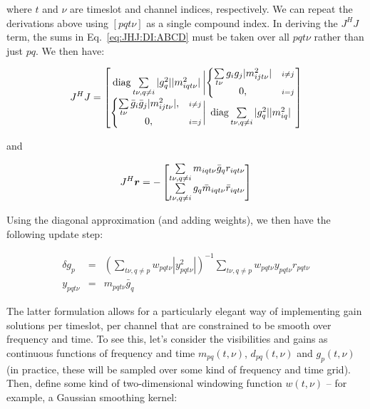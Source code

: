 \documentclass[useAMS,usenatbib]{mn2e}
\newcommand{\JJ}{J} %
\newcommand{\JHJ}{J^H J} %
\begin{document}
where $t$ and $\nu$ are timeslot and channel indices, respectively. We can repeat the derivations above using 
$[pqt\nu]$ as a single compound index. In deriving the $\JHJ$ term, the sums in Eq.~\ref{eq:JHJ:DI:ABCD}
must be taken over all $pqt\nu$ rather than just $pq$. We then have:

\begin{equation}
\label{eq:JHJ:DI:tf}
\JJ^H \JJ = \Matrix{c@{\bigg |}c}{
\mathrm{diag} \sum\limits_{t\nu,q\ne i} |g^2_{q}| |m^2_{iqt\nu}| & 
  \left \{ 
  \begin{array}{@{}cc@{}}
   \sum\limits_{t\nu} g_{i} g_{j} |m^2_{ijt\nu}|&{\scriptstyle i\ne j} \\
   0, &{\scriptstyle i=j}
  \end{array} \right .\\
  \left \{ 
  \begin{array}{@{}cc@{}}
   \sum\limits_{t\nu} \bar{g}_{i} \bar{g}_{j} |m^2_{ijt\nu}|,&{\scriptstyle i\ne j} \\
   0, &{\scriptstyle i=j}
  \end{array} \right . 
  & \mathrm{diag} \sum\limits_{t\nu,q\ne i} |g^2_{q}| |m^2_{iq}| 
}
\end{equation}

and 

\begin{equation}
\label{eq:JHR:DI:tf}
\JJ^H\bmath{r} 
= -\Matrix{c}{
\sum\limits_{t\nu,q\ne i} m_{iqt\nu}\bar{g}_q r_{iqt\nu}   \\
\sum\limits_{t\nu,q\ne i} g_q \bar{m}_{iqt\nu} \bar{r}_{iqt\nu}  
}
\end{equation}

Using the diagonal approximation (and adding weights), we then have the following update step:

\begin{eqnarray*}
\label{eq:JHJ:diag:W:tf}
\delta g_p &=& \left( \sum\limits_{t\nu,q\ne p} w_{pqt\nu} |y^2_{pqt\nu}| \right )^{-1} \sum\limits_{t\nu,q\ne p} w_{pqt\nu} y_{pqt\nu} r_{pqt\nu}\\
y_{pqt\nu}&=&m_{pqt\nu}\bar{g}_q \nonumber
\end{eqnarray*}

The latter formulation allows for a particularly elegant way of implementing gain solutions per timeslot, per channel
that are constrained to be smooth over frequency and time. To see this, let's consider the visibilities and gains as
continuous functions of frequency and time $m_{pq}(t,\nu)$, $d_{pq}(t,\nu)$ and $g_p(t,\nu)$ (in practice, these will be sampled over some kind of frequency and time grid). Then, define some kind of two-dimensional windowing function $w(t,\nu)$ -- for example, 
a Gaussian smoothing kernel:
\end{document}
